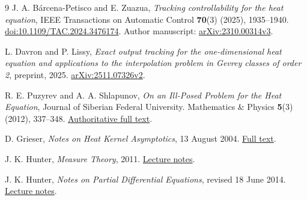 \documentclass[11pt]{article}
\theoremstyle{remark}
\begin{document}
\begin{thebibliography}{9}
J. A. B\'arcena-Petisco and E. Zuazua,
\emph{Tracking controllability for the heat equation},
IEEE Transactions on Automatic Control \textbf{70}(3) (2025), 1935--1940.
\href{https://doi.org/10.1109/TAC.2024.3476174}{doi:10.1109/TAC.2024.3476174}.
Author manuscript:
\href{https://arxiv.org/abs/2310.00314v3}{arXiv:2310.00314v3}.

L. Davron and P. Lissy,
\emph{Exact output tracking for the one-dimensional heat equation and
applications to the interpolation problem in Gevrey classes of order 2},
preprint, 2025.
\href{https://arxiv.org/abs/2511.07326v2}{arXiv:2511.07326v2}.

R. E. Puzyrev and A. A. Shlapunov,
\emph{On an Ill-Posed Problem for the Heat Equation},
Journal of Siberian Federal University. Mathematics \& Physics
\textbf{5}(3) (2012), 337--348.
\href{https://elib.sfu-kras.ru/bitstream/2311/2924/1/shlapunev.pdf}{Authoritative full text}.

D. Grieser,
\emph{Notes on Heat Kernel Asymptotics},
13 August 2004.
\href{https://web.math.ku.dk/grubb/notes/heat.pdf}{Full text}.

J. K. Hunter,
\emph{Measure Theory}, 2011.
\href{https://www.math.ucdavis.edu/~hunter/measure_theory/measure_notes.pdf}{Lecture notes}.

J. K. Hunter,
\emph{Notes on Partial Differential Equations}, revised 18 June 2014.
\href{https://www.math.ucdavis.edu/~hunter/pdes/pde_notes.pdf}{Lecture notes}.
\end{thebibliography}
\end{document}
